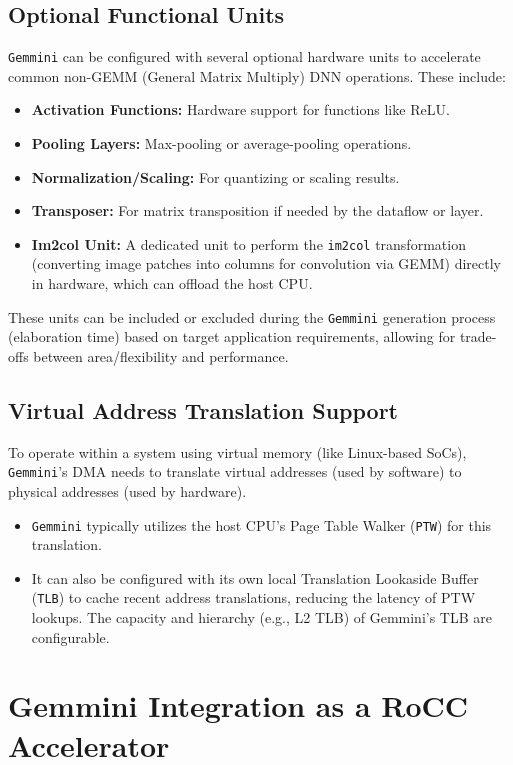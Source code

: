 \subsection{Optional Functional Units}
\label{subsec:gemmini_optional_units}
\texttt{Gemmini} can be configured with several optional hardware units to accelerate common non-GEMM (General Matrix Multiply) DNN operations. These include:
\begin{itemize}
    \item \textbf{Activation Functions:} Hardware support for functions like ReLU.
    \item \textbf{Pooling Layers:} Max-pooling or average-pooling operations.
    \item \textbf{Normalization/Scaling:} For quantizing or scaling results.
    \item \textbf{Transposer:} For matrix transposition if needed by the dataflow or layer.
    \item \textbf{Im2col Unit:} A dedicated unit to perform the \texttt{im2col} transformation (converting image patches into columns for convolution via GEMM) directly in hardware, which can offload the host CPU.
\end{itemize}
These units can be included or excluded during the \texttt{Gemmini} generation process (elaboration time) based on target application requirements, allowing for trade-offs between area/flexibility and performance.

\subsection{Virtual Address Translation Support}
\label{subsec:gemmini_vat}
To operate within a system using virtual memory (like Linux-based SoCs), \texttt{Gemmini}'s DMA needs to translate virtual addresses (used by software) to physical addresses (used by hardware).
\begin{itemize}
    \item \texttt{Gemmini} typically utilizes the host CPU's Page Table Walker (\texttt{PTW}) for this translation.
    \item It can also be configured with its own local Translation Lookaside Buffer (\texttt{TLB}) to cache recent address translations, reducing the latency of PTW lookups. The capacity and hierarchy (e.g., L2 TLB) of Gemmini's TLB are configurable.
\end{itemize}

\section{Gemmini Integration as a RoCC Accelerator}
\label{sec:gemmini_rocc_integration}

